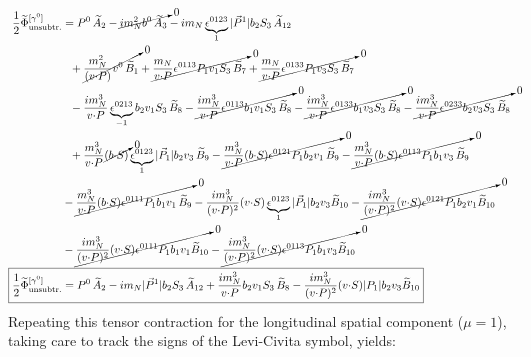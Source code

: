 \begingroup\footnotesize
\begin{align}
    \frac{1}{2}\widetilde \Phi^{[\gamma^{0}]}_{\unsub} & = 
		P^0\, \tAmp_2 - \cancelto{0}{i \mN^2 \bvec^0\, \tAmp_3}
		- i \mN \underbrace{\epsilon^{0 123}}_{1} |\vec{P}^1| \bvec_2 S_3\, \tAmp_{12} \nonumber \\ &
		~~+ \cancelto{0}{\frac{\mN^2}{(v \tcdot P)} v^0\, \tBmp_1 }
		+ \cancelto{0}{\frac{\mN}{v \tcdot P} \epsilon^{0 113} P_1 v_1 S_3\, \tBmp_7  }+ \cancelto{0}{\frac{\mN}{v \tcdot P} \epsilon^{0 133} P_1 v_3 S_3\, \tBmp_7  }
		 \nonumber \\ &
		~~- \frac{ i \mN^3}{v \tcdot P} \underbrace{\epsilon^{0 213}}_{-1} \bvec_2 v_1 S_3\, \tBmp_8 - \cancelto{0}{\frac{ i \mN^3}{v \tcdot P}\epsilon^{0 113} \bvec_1 v_1 S_3\, \tBmp_8}- \cancelto{0}{\frac{ i \mN^3}{v \tcdot P}\epsilon^{0 133} \bvec_1 v_3 S_3\, \tBmp_8}- \cancelto{0}{\frac{ i \mN^3}{v \tcdot P}\epsilon^{0 233} \bvec_2 v_3 S_3\, \tBmp_8}\nonumber \\ &
		~~+ \frac{\mN^3}{v \tcdot P} \cancelto{0}{(\bvec \tcdot S)} \underbrace{\epsilon^{0 123}}_{1} |\vec{P}_1| \bvec_2 v_3\, \tBmp_9- \cancelto{0}{\frac{\mN^3}{v \tcdot P} (\bvec \tcdot S) \epsilon^{0 121} P_1 \bvec_2 v_1\, \tBmp_9}- \cancelto{0}{\frac{\mN^3}{v \tcdot P} (\bvec \tcdot S) \epsilon^{0 113} P_1 \bvec_1 v_3\, \tBmp_9} \nonumber \\ &
        - \cancelto{0}{\frac{\mN^3}{v \tcdot P} (\bvec \tcdot S) \epsilon^{0 111} P_1 \bvec_1 v_1\, \tBmp_9} - \frac{i \mN^3}{(v \tcdot P)^2} (v \tcdot S) \underbrace{\epsilon^{0 123}}_{1} |\vec{P}_1| \bvec_2 v_3 \tBmp_{10}
		- \cancelto{0}{\frac{i \mN^3}{(v \tcdot P)^2} (v \tcdot S) \epsilon^{0 121} P_1 \bvec_2 v_1 \tBmp_{10}} \nonumber \\ &
        - \cancelto{0}{\frac{i \mN^3}{(v \tcdot P)^2} (v \tcdot S) \epsilon^{0 111} P_1 \bvec_1 v_1 \tBmp_{10}} - \cancelto{0}{\frac{i \mN^3}{(v \tcdot P)^2} (v \tcdot S) \epsilon^{0 113} P_1 \bvec_1 v_3 \tBmp_{10}}\\
  \Aboxed{ \frac{1}{2}\widetilde \Phi^{[\gamma^{0}]}_{\unsub}& = P^0\, \tAmp_2  - i \mN  |\vec{P}^1| \bvec_2 S_3\, \tAmp_{12}+ \frac{ i \mN^3}{v \tcdot P}  \bvec_2 v_1 S_3\, \tBmp_8- \frac{i \mN^3}{(v \tcdot P)^2} (v \tcdot S)  |P_1| \bvec_2 v_3 \tBmp_{10}}
\end{align}
\endgroup
Repeating this tensor contraction for the longitudinal spatial component ($\mu = 1$), taking care to track the signs of the Levi-Civita symbol, yields:
\begingroup\footnotesize
